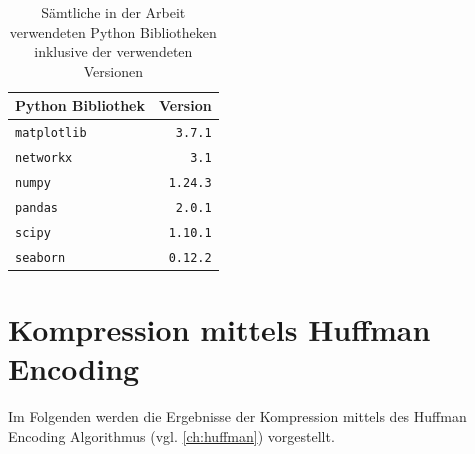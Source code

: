 \documentclass{ffhsthesis}
\begin{document}
\begin{table}[h]
\centering
\begin{tabular}{@{}lr@{}}
\toprule
Python Bibliothek    & Version \\
\midrule
\texttt{matplotlib} & \texttt{3.7.1} \\
\texttt{networkx} & \texttt{3.1} \\
\texttt{numpy} & \texttt{1.24.3} \\
\texttt{pandas} & \texttt{2.0.1} \\
\texttt{scipy} & \texttt{1.10.1} \\
\texttt{seaborn} & \texttt{0.12.2} \\
\bottomrule
\end{tabular}
\caption{Sämtliche in der Arbeit verwendeten Python Bibliotheken inklusive der verwendeten Versionen}
\label{tab:biblio}
\end{table}

\section{Kompression mittels Huffman Encoding}
Im Folgenden werden die Ergebnisse der Kompression mittels des Huffman Encoding Algorithmus (vgl. \ref{ch:huffman}) vorgestellt.
\end{document}
